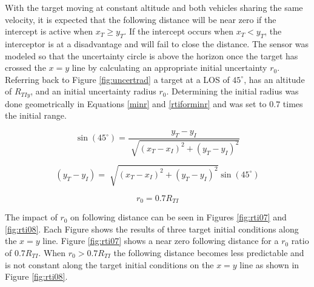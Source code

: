 \documentclass[conference]{IEEEtran}
\begin{document}
With the target moving at constant altitude and both vehicles sharing the same velocity, it is expected that the following distance will be near zero if the intercept is active when $x_T \geq y_T$. If the intercept occurs when $x_T<y_T$, the interceptor is at a disadvantage and will fail to close the distance. The sensor was modeled so that the uncertainty circle is above the horizon once the target has crossed the $x=y$ line by calculating an appropriate initial uncertainty $r_0$. Referring back to Figure \ref{fig:uncertrad} a target at a LOS of $45^{\circ}$, has an altitude of $R_{TIy}$, and an initial uncertainty radius $r_0$. Determining the initial radius was done geometrically in Equations \ref{minr} and \ref{rtiforminr} and was set to $0.7$ times the initial range.





\begin{equation} \label{minr}
\sin(45^\circ) = \frac{y_T - y_I}{\sqrt[]{(x_T - x_I)^2+(y_T - y_I)^2}}
\end{equation}



\begin{equation} \label{rtiforminr}
 (y_T - y_I) = \sqrt[]{(x_T - x_I)^2+(y_T - y_I)^2}\sin(45^\circ)
\end{equation}


\begin{equation} \label{initialr}
r_0 = 0.7R_{TI}
\end{equation}

The impact of $r_0$ on following distance can be seen in Figures \ref{fig:rti07} and \ref{fig:rti08}.
 Each Figure shows the results of three target initial conditions along the $x=y$ line. Figure \ref{fig:rti07} shows a near zero following distance for a $r_0$ ratio of $0.7R_{TI}$. When $r_0>0.7R_{TI}$ the following distance becomes less predictable and is not constant along the target initial conditions on the $x=y$ line as shown in Figure \ref{fig:rti08}.
 
\end{document}
